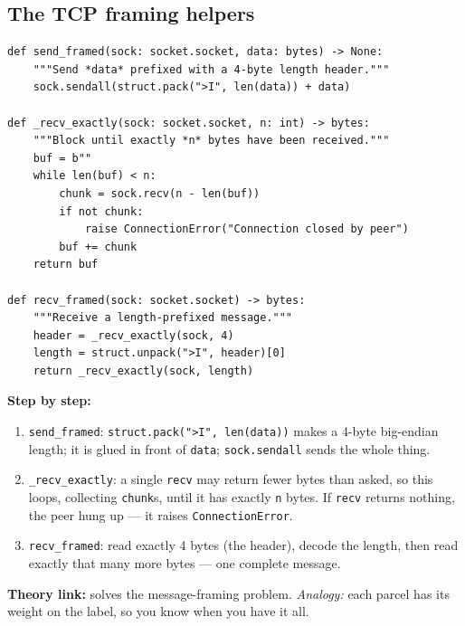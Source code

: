 \documentclass[11pt,a4paper]{article}
\begin{document}
\subsection{The TCP framing helpers}
\begin{lstlisting}[style=py,caption={vehicle\_node.py --- length-prefix framing helpers.}]
def send_framed(sock: socket.socket, data: bytes) -> None:
    """Send *data* prefixed with a 4-byte length header."""
    sock.sendall(struct.pack(">I", len(data)) + data)

def _recv_exactly(sock: socket.socket, n: int) -> bytes:
    """Block until exactly *n* bytes have been received."""
    buf = b""
    while len(buf) < n:
        chunk = sock.recv(n - len(buf))
        if not chunk:
            raise ConnectionError("Connection closed by peer")
        buf += chunk
    return buf

def recv_framed(sock: socket.socket) -> bytes:
    """Receive a length-prefixed message."""
    header = _recv_exactly(sock, 4)
    length = struct.unpack(">I", header)[0]
    return _recv_exactly(sock, length)
\end{lstlisting}
\textbf{Step by step:}
\begin{enumerate}
  \item \texttt{send\_framed}: \texttt{struct.pack(">I", len(data))} makes a
        4-byte big-endian length; it is glued in front of \texttt{data};
        \texttt{sock.sendall} sends the whole thing.
  \item \texttt{\_recv\_exactly}: a single \texttt{recv} may return fewer bytes
        than asked, so this loops, collecting \texttt{chunk}s, until it has
        exactly \texttt{n} bytes. If \texttt{recv} returns nothing, the peer hung
        up --- it raises \texttt{ConnectionError}.
  \item \texttt{recv\_framed}: read exactly 4 bytes (the header), decode the
        length, then read exactly that many more bytes --- one complete message.
\end{enumerate}
\textbf{Theory link:} solves the message-framing problem. \emph{Analogy:} each
parcel has its weight on the label, so you know when you have it all.
\end{document}
